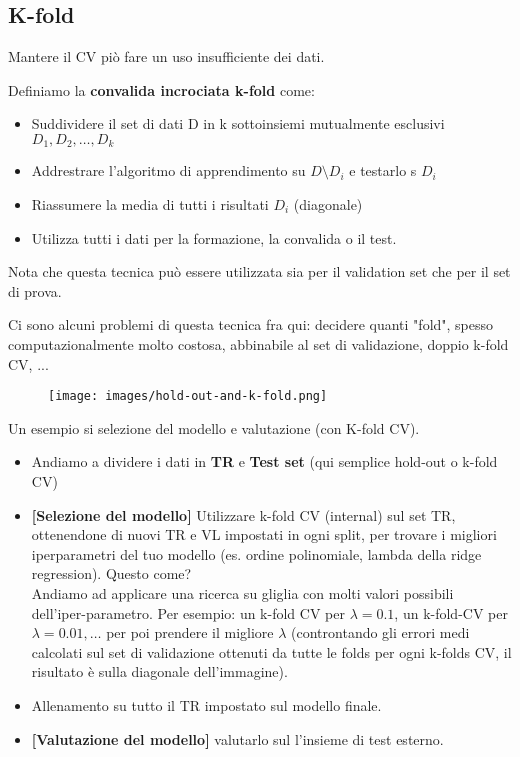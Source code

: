 \subsection{K-fold}
Mantere il CV piò fare un uso insufficiente dei dati.
\begin{definition}
    Definiamo la \textbf{convalida incrociata k-fold} come:
    \begin{itemize}
        \item Suddividere il set di dati D in k sottoinsiemi mutualmente esclusivi $D_1, D_2, \dots, D_k$
        \item Addrestrare l'algoritmo di apprendimento su $D \setminus D_i$ e testarlo s $D_i$
        \item Riassumere la media di tutti i risultati $D_i$ (diagonale)
        \item Utilizza tutti i dati per la formazione, la convalida o il test.
    \end{itemize}
\end{definition}
\begin{note}
    Nota che questa tecnica può essere utilizzata sia per il validation set che per il set di prova.
\end{note}
\hspace{-15pt}Ci sono alcuni problemi di questa tecnica fra qui: decidere quanti "fold", spesso computazionalmente molto costosa, 
abbinabile al set di validazione, doppio k-fold CV, ...
\begin{figure}[h!]
    \centering
    \texttt{[image: images/hold-out-and-k-fold.png]}
\end{figure}
\begin{example}
    Un esempio si selezione del modello e valutazione (con K-fold CV).
    \begin{itemize}
        \item Andiamo a dividere i dati in \textbf{TR} e \textbf{Test set} (qui semplice hold-out o k-fold CV)
        \item \textbf{[Selezione del modello]} Utilizzare k-fold CV (internal) sul set TR, ottenendone di nuovi TR e VL impostati in ogni split, per trovare i migliori iperparametri del tuo modello (es.
        ordine polinomiale, lambda della ridge regression). Questo come?\\
        Andiamo ad applicare una ricerca su gliglia con molti valori possibili dell'iper-parametro. Per esempio:
        un k-fold CV per $\lambda= 0.1$, un k-fold-CV per $\lambda=0.01, \dots$ per poi prendere il migliore $\lambda$ (controntando gli errori medi calcolati sul 
        set di validazione ottenuti da tutte le folds per ogni k-folds CV, il risultato è sulla diagonale dell'immagine).
        \item Allenamento su tutto il TR impostato sul modello finale.
        \item \textbf{[Valutazione del modello]} valutarlo sul l'insieme di test esterno.
    \end{itemize}
\end{example}
